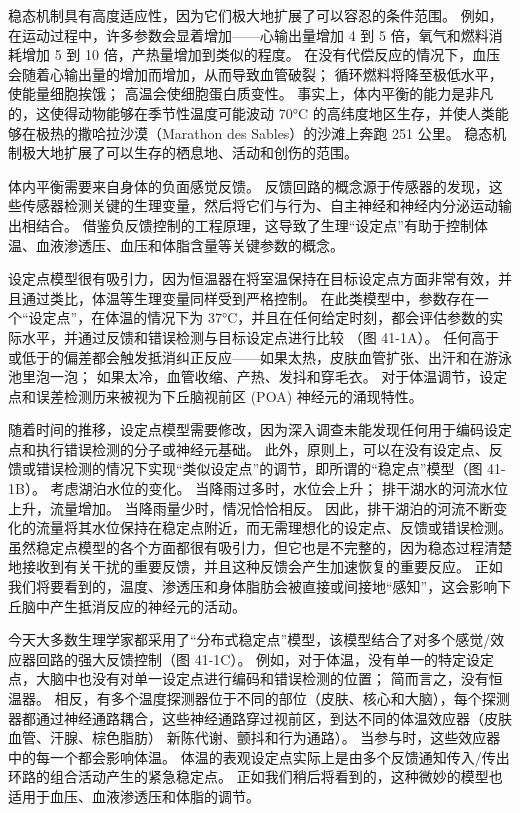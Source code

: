稳态机制具有高度适应性，因为它们极大地扩展了可以容忍的条件范围。 例如，在运动过程中，许多参数会显着增加——心输出量增加 4 到 5 倍，氧气和燃料消耗增加 5 到 10 倍，产热量增加到类似的程度。 在没有代偿反应的情况下，血压会随着心输出量的增加而增加，从而导致血管破裂； 循环燃料将降至极低水平，使能量细胞挨饿； 高温会使细胞蛋白质变性。 事实上，体内平衡的能力是非凡的，这使得动物能够在季节性温度可能波动 70°C 的高纬度地区生存，并使人类能够在极热的撒哈拉沙漠（Marathon des Sables）的沙滩上奔跑 251 公里。 稳态机制极大地扩展了可以生存的栖息地、活动和创伤的范围。

体内平衡需要来自身体的负面感觉反馈。 反馈回路的概念源于传感器的发现，这些传感器检测关键的生理变量，然后将它们与行为、自主神经和神经内分泌运动输出相结合。 借鉴负反馈控制的工程原理，这导致了生理“设定点”有助于控制体温、血液渗透压、血压和体脂含量等关键参数的概念。

设定点模型很有吸引力，因为恒温器在将室温保持在目标设定点方面非常有效，并且通过类比，体温等生理变量同样受到严格控制。 在此类模型中，参数存在一个“设定点”，在体温的情况下为 37°C，并且在任何给定时刻，都会评估参数的实际水平，并通过反馈和错误检测与目标设定点进行比较 （图 41-1A）。 任何高于或低于的偏差都会触发抵消纠正反应——如果太热，皮肤血管扩张、出汗和在游泳池里泡一泡； 如果太冷，血管收缩、产热、发抖和穿毛衣。 对于体温调节，设定点和误差检测历来被视为下丘脑视前区 (POA) 神经元的涌现特性。

随着时间的推移，设定点模型需要修改，因为深入调查未能发现任何用于编码设定点和执行错误检测的分子或神经元基础。 此外，原则上，可以在没有设定点、反馈或错误检测的情况下实现“类似设定点”的调节，即所谓的“稳定点”模型（图 41-1B）。 考虑湖泊水位的变化。 当降雨过多时，水位会上升； 排干湖水的河流水位上升，流量增加。 当降雨量少时，情况恰恰相反。 因此，排干湖泊的河流不断变化的流量将其水位保持在稳定点附近，而无需理想化的设定点、反馈或错误检测。 虽然稳定点模型的各个方面都很有吸引力，但它也是不完整的，因为稳态过程清楚地接收到有关干扰的重要反馈，并且这种反馈会产生加速恢复的重要反应。 正如我们将要看到的，温度、渗透压和身体脂肪会被直接或间接地“感知”，这会影响下丘脑中产生抵消反应的神经元的活动。

今天大多数生理学家都采用了“分布式稳定点”模型，该模型结合了对多个感觉/效应器回路的强大反馈控制（图 41-1C）。 例如，对于体温，没有单一的特定设定点，大脑中也没有对单一设定点进行编码和错误检测的位置； 简而言之，没有恒温器。 相反，有多个温度探测器位于不同的部位（皮肤、核心和大脑），每个探测器都通过神经通路耦合，这些神经通路穿过视前区，到达不同的体温效应器（皮肤血管、汗腺、棕色脂肪） 新陈代谢、颤抖和行为通路）。 当参与时，这些效应器中的每一个都会影响体温。 体温的表观设定点实际上是由多个反馈通知传入/传出环路的组合活动产生的紧急稳定点。 正如我们稍后将看到的，这种微妙的模型也适用于血压、血液渗透压和体脂的调节。

